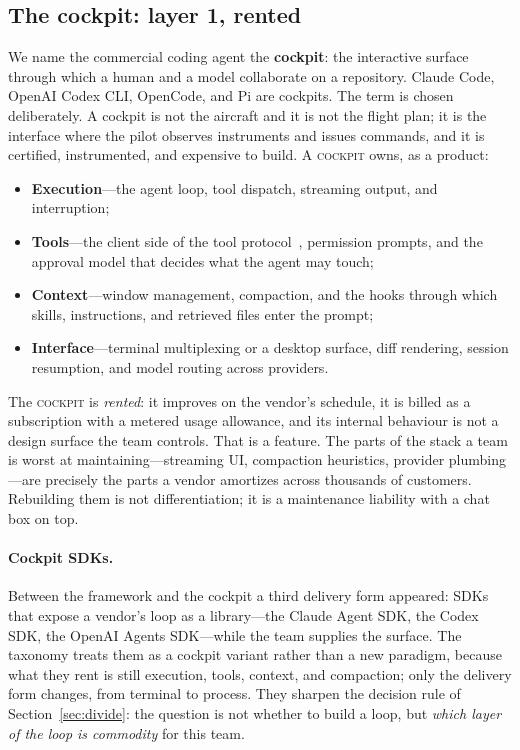 \documentclass[10pt,a4paper]{article}
\theoremstyle{definition}
\theoremstyle{plain}
\theoremstyle{principle}
\newcommand{\ck}{\textsc{cockpit}}
\begin{document}
\subsection{The cockpit: layer 1, rented}\label{sec:cockpit}

We name the commercial coding agent the \textbf{cockpit}: the interactive surface through which a
human and a model collaborate on a repository. Claude Code, OpenAI Codex CLI, OpenCode, and Pi are
cockpits. The term is chosen deliberately. A cockpit is not the aircraft and it is not the flight
plan; it is the interface where the pilot observes instruments and issues commands, and it is
certified, instrumented, and expensive to build. A \ck{} owns, as a product:

\begin{itemize}
  \item \textbf{Execution}---the agent loop, tool dispatch, streaming output, and interruption;
  \item \textbf{Tools}---the client side of the tool protocol~\cite{mcp}, permission prompts, and
        the approval model that decides what the agent may touch;
  \item \textbf{Context}---window management, compaction, and the hooks through which skills,
        instructions, and retrieved files enter the prompt;
  \item \textbf{Interface}---terminal multiplexing or a desktop surface, diff rendering, session
        resumption, and model routing across providers.
\end{itemize}

The \ck{} is \emph{rented}: it improves on the vendor's schedule, it is billed as a subscription
with a metered usage allowance, and its internal behaviour is not a design surface the team
controls. That is a feature. The parts of the
stack a team is worst at maintaining---streaming UI, compaction heuristics, provider
plumbing---are precisely the parts a vendor amortizes across thousands of customers. Rebuilding
them is not differentiation; it is a maintenance liability with a chat box on top.

\paragraph{Cockpit SDKs.} Between the framework and the cockpit a third delivery form appeared:
SDKs that expose a vendor's loop as a library---the Claude Agent SDK, the Codex SDK, the OpenAI
Agents SDK---while the team supplies the surface. The taxonomy treats them as a cockpit variant
rather than a new paradigm, because what they rent is still execution, tools, context, and
compaction; only the delivery form changes, from terminal to process. They sharpen the decision rule
of Section~\ref{sec:divide}: the question is not whether to build a loop, but \emph{which layer of
the loop is commodity} for this team.
\end{document}

